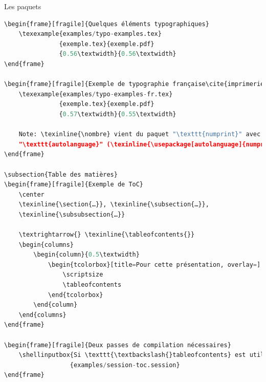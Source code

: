 \documentclass[usenames,dvipsnames,10pt]{beamer} %
\newcommand{\texinputbox}[2]{
    \begin{tcolorbox}[title=#1,colframe=PineGreen]
        \selectlanguage{english}
        \texinput{#2}
    \end{tcolorbox}
}
\newcommand{\texexample}[5]{
    \begin{columns}
        \begin{column}{#4}
            \texinputbox{#2}{#1}
        \end{column}

        \begin{column}{#5}
            \begin{tcolorbox}[title=#3, overlay=]
                
            \end{tcolorbox}
        \end{column}
    \end{columns}
}
\newcommand{\shellinputbox}[2]{
    \begin{tcolorbox}[title=#1,overlay=,colframe=Violet]
        \selectlanguage{english}
        \shellinput{#2}
    \end{tcolorbox}
}
\begin{document}
\begin{frame}[fragile]{Les paquets}
\begin{description}
{\begin{lstlisting}[language=Python]
\begin{frame}[fragile]{Quelques éléments typographiques}
    \texexample{examples/typo-examples.tex}
               {exemple.tex}{exemple.pdf}
               {0.56\textwidth}{0.56\textwidth}
\end{frame}

\begin{frame}[fragile]{Exemple de typographie française\cite{imprimerie2002lexique}}
    \texexample{examples/typo-examples-fr.tex}
               {exemple.tex}{exemple.pdf}
               {0.57\textwidth}{0.55\textwidth}

    Note: \texinline{\nombre} vient du paquet "\texttt{numprint}" avec l'option
    "\texttt{autolanguage}" (\texinline{\usepackage[autolanguage]{numprint}}).
\end{frame}

\subsection{Table des matières}
\begin{frame}[fragile]{Exemple de ToC}
    \center
    \texinline{\section{…}}, \texinline{\subsection{…}},
    \texinline{\subsubsection{…}}

    \textrightarrow{} \texinline{\tableofcontents{}}
    \begin{columns}
        \begin{column}{0.5\textwidth}
            \begin{tcolorbox}[title=Pour cette présentation, overlay=]
                \scriptsize
                \tableofcontents
            \end{tcolorbox}
        \end{column}
    \end{columns}
\end{frame}

\begin{frame}[fragile]{Deux passes de compilation nécessaires}
    \shellinputbox{Si \texttt{\textbackslash{}tableofcontents} est utilisé}
                  {examples/session-toc.session}
\end{frame}


\end{lstlisting}}
\end{description}
\end{frame}
\end{document}
